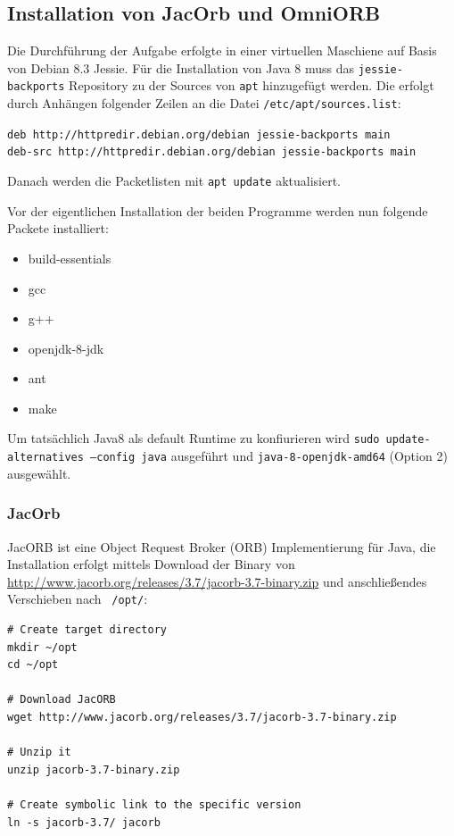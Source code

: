 \subsection{Installation von JacOrb\cite{jacorb} und OmniORB\cite{omniorb}}
Die Durchf\"uhrung der Aufgabe erfolgte in einer virtuellen Maschiene auf Basis von Debian 8.3 Jessie.
F\"ur die Installation von Java 8 muss das \texttt{jessie-backports} Repository zu der Sources von \texttt{apt} hinzugef\"ugt werden.
Die erfolgt durch Anh\"angen folgender Zeilen an die Datei \texttt{/etc/apt/sources.list}:

\texttt{deb http://httpredir.debian.org/debian jessie-backports main\\
deb-src http://httpredir.debian.org/debian jessie-backports main}

Danach werden die Packetlisten mit \texttt{apt update} aktualisiert.

Vor der eigentlichen Installation der beiden Programme werden nun folgende Packete installiert:
\begin{itemize}
    \item build-essentials
    \item gcc
    \item g++
    \item openjdk-8-jdk
    \item ant
    \item make
\end{itemize}

Um tats\"achlich Java8 als default Runtime zu konfiurieren wird \texttt{sudo update-alternatives --config java} ausgef\"uhrt und \texttt{java-8-openjdk-amd64} (Option 2) ausgew\"ahlt.

\subsubsection{JacOrb}
JacORB ist eine Object Request Broker (ORB) Implementierung f\"ur Java, die Installation erfolgt mittels Download der Binary von \url{http://www.jacorb.org/releases/3.7/jacorb-3.7-binary.zip} und anschlie\ss endes Verschieben nach \texttt{~/opt/}:
\begin{lstlisting}[caption=Installation von JacORB]
# Create target directory
mkdir ~/opt
cd ~/opt

# Download JacORB
wget http://www.jacorb.org/releases/3.7/jacorb-3.7-binary.zip

# Unzip it
unzip jacorb-3.7-binary.zip

# Create symbolic link to the specific version
ln -s jacorb-3.7/ jacorb
\end{lstlisting}


